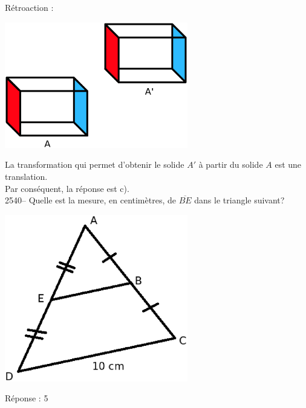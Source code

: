 \documentclass[letterpaper, 12pt]{article}
\begin{document}
R\'etroaction :\\
\begin{center}
 \includegraphics[width=8cm,bb=14 14 699 527]{Q2539.eps}
\end{center}
La transformation qui permet d'obtenir le solide $A'$ \`a partir du solide $A$ est une translation. \\
Par cons\'equent, la r\'eponse est c).\\

2540-- Quelle est la mesure, en centim\`etres, de $\overline{BE}$ dans le triangle suivant?\\
\begin{center}
 \includegraphics[width=8cm,bb=0 439 538 842]{Q2540.eps}
\end{center}

R\'eponse : 5\\
\end{document}
